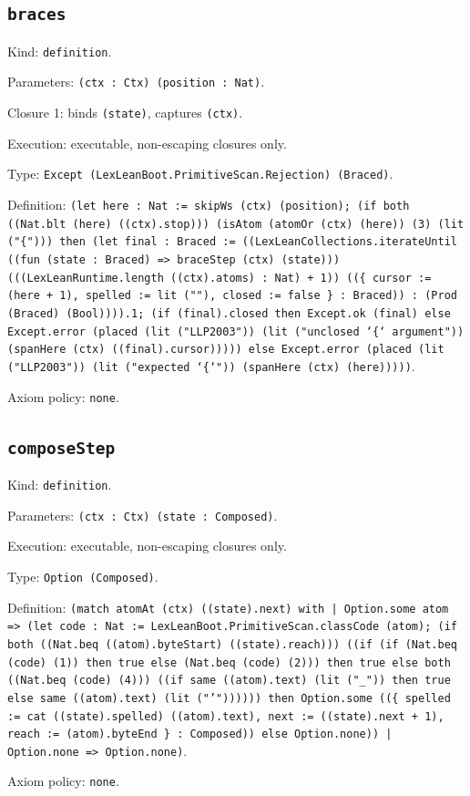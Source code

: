 \documentclass[11pt]{article}
\begin{document}
\subsection*{\texttt{braces}}
\noindent Kind: \texttt{definition}.\par
\noindent Parameters: \texttt{(ctx : Ctx) (position : Nat)}.\par
\noindent Closure 1: binds \texttt{(state)}, captures \texttt{(ctx)}.\par
\noindent Execution: executable, non-escaping closures only.\par
\noindent Type: \texttt{Except (LexLeanBoot.PrimitiveScan.Rejection) (Braced)}.\par
\noindent Definition: \texttt{(let here : Nat := skipWs (ctx) (position); (if both ((Nat.blt (here) ((ctx).stop))) (isAtom (atomOr (ctx) (here)) (3) (lit ("\{"))) then (let final : Braced := ((LexLeanCollections.iterateUntil ((fun (state : Braced) => braceStep (ctx) (state))) (((LexLeanRuntime.length ((ctx).atoms) : Nat) + 1)) ((\{ cursor := (here + 1), spelled := lit (""), closed := false \} : Braced)) : (Prod (Braced) (Bool)))).1; (if (final).closed then Except.ok (final) else Except.error (placed (lit ("LLP2003")) (lit ("unclosed `\{` argument")) (spanHere (ctx) ((final).cursor))))) else Except.error (placed (lit ("LLP2003")) (lit ("expected `\{`")) (spanHere (ctx) (here)))))}.\par
\noindent Axiom policy: \texttt{none}.\par
\subsection*{\texttt{composeStep}}
\noindent Kind: \texttt{definition}.\par
\noindent Parameters: \texttt{(ctx : Ctx) (state : Composed)}.\par
\noindent Execution: executable, non-escaping closures only.\par
\noindent Type: \texttt{Option (Composed)}.\par
\noindent Definition: \texttt{(match atomAt (ctx) ((state).next) with | Option.some atom => (let code : Nat := LexLeanBoot.PrimitiveScan.classCode (atom); (if both ((Nat.beq ((atom).byteStart) ((state).reach))) ((if (if (Nat.beq (code) (1)) then true else (Nat.beq (code) (2))) then true else both ((Nat.beq (code) (4))) ((if same ((atom).text) (lit ("\_")) then true else same ((atom).text) (lit ("'")))))) then Option.some ((\{ spelled := cat ((state).spelled) ((atom).text), next := ((state).next + 1), reach := (atom).byteEnd \} : Composed)) else Option.none)) | Option.none => Option.none)}.\par
\noindent Axiom policy: \texttt{none}.\par
\end{document}
